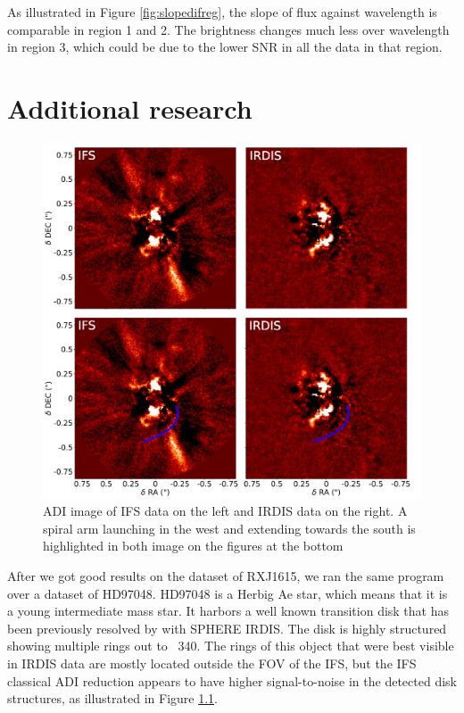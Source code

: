 \documentclass[twoside,single,12pt]{lion-msc}
\begin{document}
As illustrated in Figure \ref{fig:slopedifreg}, the slope of flux against wavelength is comparable in region 1 and 2. The brightness changes much less over wavelength in region 3, which could be due to the lower SNR in all the data in that region.

\chapter{Additional research}
\begin{figure}
\vspace{-6mm}
\centering
\includegraphics[width=\linewidth]{hdadi}
\caption{ADI image of IFS data on the left and IRDIS data on the right. A spiral arm launching in the west and extending towards the south is highlighted in both image on the figures at the bottom}
\label{fig:hdadi}
\vspace{-8mm}
\end{figure}

After we got good results on the dataset of RXJ1615, we ran the same program over a dataset of HD97048. HD97048 is a Herbig Ae star, which means that it is a young intermediate mass star. It harbors a well known transition disk that has been previously resolved by \citep{Ginski2016} with SPHERE IRDIS. The disk is highly structured showing multiple rings out to ~340. The rings of this object that were best visible in IRDIS data are mostly located outside the FOV of the IFS, but the IFS classical ADI reduction appears to have higher signal-to-noise in the detected disk structures, as illustrated in Figure \ref{fig:hdadi}.
\bigskip
\end{document}
